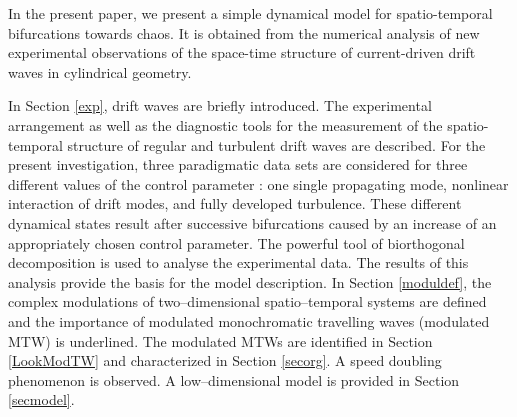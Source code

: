 In the present paper, we present a simple dynamical model for 
spatio-temporal bifurcations towards chaos. It is obtained from 
the numerical analysis of new experimental observations of the 
space-time structure of current-driven drift waves in cylindrical 
geometry. 

In Section \ref{exp}, drift waves are briefly introduced. 
The experimental arrangement as well as the diagnostic tools for
the measurement of the spatio-temporal structure of regular and 
turbulent drift waves are described. For the present investigation,
three paradigmatic data sets
are considered for three different values of the control parameter :
one single propagating mode, nonlinear interaction
of drift modes, and fully developed turbulence. These different
dynamical states result after successive bifurcations caused by
an increase of an appropriately chosen control parameter. 
The powerful tool 
of biorthogonal decomposition \cite{LimaCom,dudok94} is used to
analyse the experimental data. The results of this analysis provide
the basis for the model description. 
In Section \ref{moduldef}, the complex modulations of
two--dimensional spatio--temporal systems are defined and
the importance of modulated monochromatic travelling waves
(modulated MTW) is underlined.
The modulated MTWs are identified in Section \ref{LookModTW}
and characterized in Section \ref{secorg}. A speed doubling
phenomenon is observed. A low--dimensional model is provided
in Section \ref{secmodel}.
%
